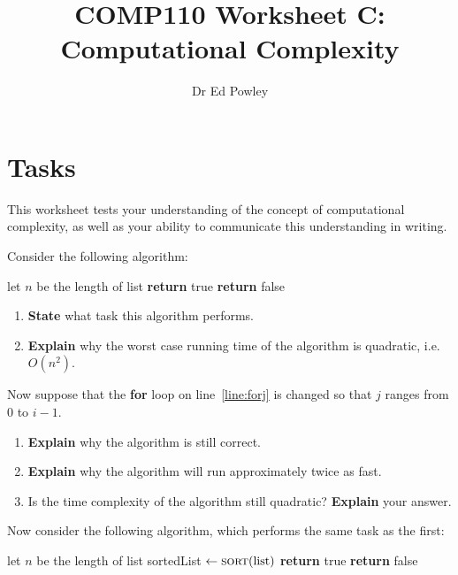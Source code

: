 \documentclass{../../fal_assignment}
\title{COMP110 Worksheet C: Computational Complexity}
\author{Dr Ed Powley}
\begin{document}
\maketitle
{}

\section*{Tasks}

This worksheet tests your understanding of the concept of computational complexity,
as well as your ability to communicate this understanding in writing.

Consider the following algorithm:

\begin{algorithmic}[1]
		\State let $n$ be the length of list
			 \label{line:forj}
					\State \textbf{return} true
				\EndIf
			\EndFor
		\EndFor
		\State \textbf{return} false
	\EndProcedure
\end{algorithmic}

\begin{enumerate}[label=(\alph*)]
	\item\label{q:first} \textbf{State} what task this algorithm performs.
	\item \textbf{Explain} why the worst case running time of the algorithm is quadratic, i.e.\ $O(n^2)$.
\end{enumerate}

Now suppose that the \textbf{for} loop on line~\ref{line:forj} is changed so that $j$ ranges from $0$ to $i-1$.

\begin{enumerate}[resume,label=(\alph*)]
	\item \textbf{Explain} why the algorithm is still correct.
	\item \textbf{Explain} why the algorithm will run approximately twice as fast.
	\item Is the time complexity of the algorithm still quadratic? \textbf{Explain} your answer.
\end{enumerate}

Now consider the following algorithm, which performs the same task as the first:

\begin{algorithmic}[1]
		\State let $n$ be the length of list
		\State sortedList $\gets \Call{sort}{\text{list}}$
				\State \textbf{return} true
			\EndIf
		\EndFor
		\State \textbf{return} false
	\EndProcedure
\end{algorithmic}
\end{document}
